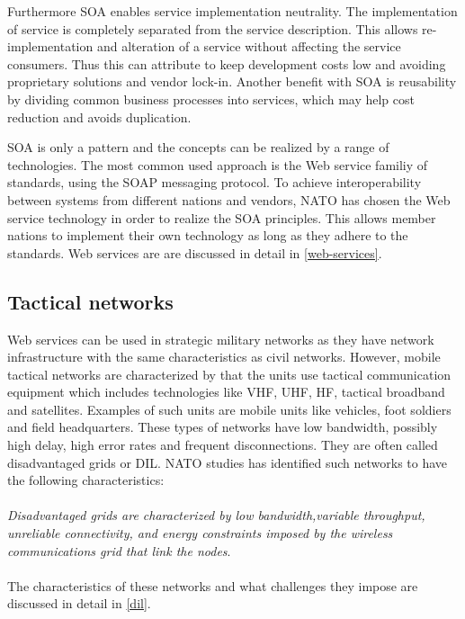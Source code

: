 \documentclass[USenglish]{ifimaster}
\begin{document}
Furthermore SOA enables service implementation neutrality. The implementation of
service is completely separated from the service description. This allows
re-implementation and alteration of a service without affecting the service
consumers. Thus this can attribute to keep development costs low and avoiding
proprietary solutions and vendor lock-in. Another benefit with SOA is
reusability by dividing common business processes into services, which may help
cost reduction and avoids duplication.

SOA is only a pattern and the concepts can be realized by a range of
technologies. The most common used approach is the Web service familiy of
standards, using the SOAP messaging protocol. To achieve interoperability
between systems from different nations and vendors, NATO has chosen the Web
service technology in order to realize the SOA principles. This allows member
nations to implement their own technology as long as they adhere to the
standards. Web services are are discussed in detail in \cref{web-services}.

\subsection{Tactical networks}
Web services can be used in strategic military networks as they have network
infrastructure with the same characteristics as civil networks. However, mobile
tactical networks are characterized by that the units use tactical communication
equipment which includes technologies like VHF, UHF, HF, tactical broadband and
satellites. Examples of such units are mobile units like vehicles, foot soldiers
and field headquarters. These types of networks have low bandwidth, possibly
high delay, high error rates and frequent disconnections. They are often called
disadvantaged grids or DIL. NATO studies has identified such networks to have
the following characteristics:
\paragraph{}
\textit{Disadvantaged grids are characterized by low bandwidth,variable throughput, unreliable connectivity, and energy constraints imposed by the wireless communications grid that link the nodes}\cite{nato-disadvantaged-grids}.

\paragraph{}
The characteristics of these networks and what challenges they impose are
discussed in detail in \cref{dil}.
\end{document}

